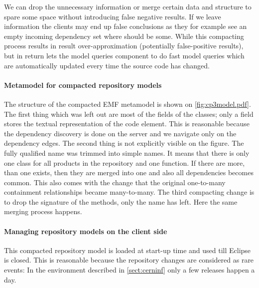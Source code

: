 
We can drop the unnecessary information or
merge certain data and structure to spare some space without introducing false
negative results. If we leave information the clients may end up false
conclusions as they for example see an empty incoming dependency set where
should be some.
While this compacting process results in result over-approximation (potentially
false-positive results), but in return lets the model queries component to do
fast model queries which are automatically updated every time the source code
has changed.


\paragraph{Metamodel for compacted repository models}
The structure of the compacted EMF metamodel is shown on
\autoref{fig:cp3model.pdf}.
The first thing which was left out are most of the fields of the classes; only a
 field stores the textual representation of the code element. This is
reasonable because the dependency discovery is done on the server and we
navigate only on the dependency edges. The second thing is not explicitly
visible on the figure. The fully qualified name was trimmed into simple
names. It means that there is only one  class for all products in
the repository and one  function. If there are more, than one
exists, then they are merged into one and also all dependencies becomes common.
This also comes with the change that the original one-to-many containment
relationships became many-to-many. The third compacting change is to drop the
signature of the methods, only the name has left. Here the same merging process happens.

\paragraph{Managing repository models on the client side}
This compacted repository model is loaded at start-up time and used till Eclipse
is closed. This is reasonable because the repository changes are considered as rare events: 
In the environment described in \autoref{sect:cerninf} only a few releases happen a day.

